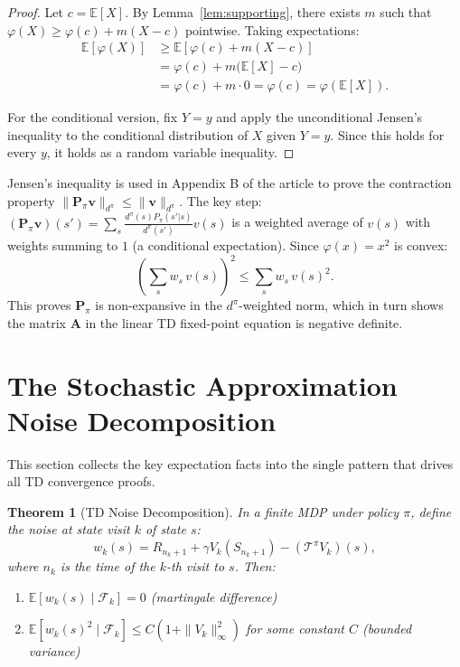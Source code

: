 \documentclass[11pt,a4paper]{article}
\theoremstyle{definition}
\theoremstyle{plain}
\newtheorem{theorem}{Theorem}[section]
\theoremstyle{remark}
\newcommand{\E}{\mathbb{E}}
\begin{document}
\begin{proof}
Let $c = \E[X]$. By Lemma~\ref{lem:supporting}, there exists $m$ such that $\varphi(X) \geq \varphi(c) + m(X - c)$ pointwise. Taking expectations:
\begin{align}
    \E[\varphi(X)]
    &\geq \E[\varphi(c) + m(X - c)] \nonumber\\
    &= \varphi(c) + m\bigl(\E[X] - c\bigr) \tag{linearity}\\
    &= \varphi(c) + m \cdot 0 = \varphi(c) = \varphi(\E[X]). \label{eq:jensen_proof}
\end{align}

For the conditional version, fix $Y = y$ and apply the unconditional Jensen's inequality to the conditional distribution of $X$ given $Y = y$. Since this holds for every $y$, it holds as a random variable inequality.
\end{proof}

\begin{tdconnection}
Jensen's inequality is used in Appendix B of the article to prove the contraction property $\|\mathbf{P}_\pi \mathbf{v}\|_{d^\pi} \leq \|\mathbf{v}\|_{d^\pi}$. The key step: $(\mathbf{P}_\pi \mathbf{v})(s') = \sum_s \frac{d^\pi(s) P_\pi(s'|s)}{d^\pi(s')} v(s)$ is a weighted average of $v(s)$ with weights summing to $1$ (a conditional expectation). Since $\varphi(x) = x^2$ is convex:
\[
    \left(\sum_s w_s\, v(s)\right)^2 \leq \sum_s w_s\, v(s)^2.
\]
This proves $\mathbf{P}_\pi$ is non-expansive in the $d^\pi$-weighted norm, which in turn shows the matrix $\mathbf{A}$ in the linear TD fixed-point equation is negative definite.
\end{tdconnection}

\section{The Stochastic Approximation Noise Decomposition}
\label{sec:noise}

This section collects the key expectation facts into the single pattern that drives all TD convergence proofs.

\begin{theorem}[TD Noise Decomposition]
\label{thm:noise_decomp}
In a finite MDP under policy $\pi$, define the noise at state visit $k$ of state $s$:
\begin{equation}
    w_k(s) = R_{n_k+1} + \gamma V_k(S_{n_k+1}) - (\mathcal{T}^\pi V_k)(s),
    \label{eq:noise_def}
\end{equation}
where $n_k$ is the time of the $k$-th visit to $s$. Then:
\begin{enumerate}[nosep]
    \item $\E[w_k(s) \mid \mathcal{F}_k] = 0$ \hfill (martingale difference)
    \item $\E[w_k(s)^2 \mid \mathcal{F}_k] \leq C(1 + \|V_k\|_\infty^2)$ for some constant $C$ \hfill (bounded variance)
\end{enumerate}
\end{theorem}
\end{document}
